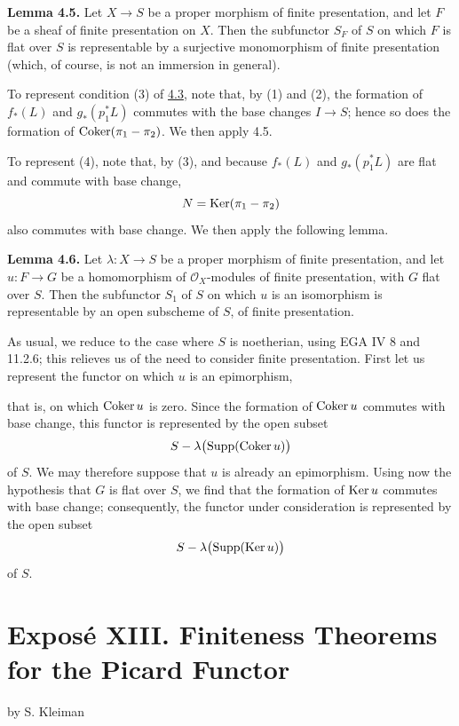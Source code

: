 \textbf{Lemma 4.5.} Let \(X\to S\) be a proper morphism of finite
presentation, and let \(F\) be a sheaf of finite presentation on \(X\). Then
the subfunctor \(S_F\) of \(S\) on which \(F\) is flat over \(S\) is
representable by a surjective monomorphism of finite presentation (which, of
course, is not an immersion in general).

To represent condition (3) of \hyperlink{sga6.e12.lem.4-3}{4.3}, note that, by (1) and (2), the formation
of \(f_*(L)\) and \(g_*(p_1^*L)\) commutes with the base changes
\(I\to S\); hence so does the formation of
\(\operatorname{Coker}(\pi_1-\pi_2)\). We then apply 4.5.

To represent (4), note that, by (3), and because \(f_*(L)\) and
\(g_*(p_1^*L)\) are flat and commute with base change,
\[
  N=\operatorname{Ker}(\pi_1-\pi_2)
\]
also commutes with base change. We then apply the following lemma.

\textbf{Lemma 4.6.} Let \(\lambda:X\to S\) be a proper morphism of finite
presentation, and let \(u:F\to G\) be a homomorphism of
\(\mathcal O_X\)-modules of finite presentation, with \(G\) flat over
\(S\). Then the subfunctor \(S_1\) of \(S\) on which \(u\) is an
isomorphism is representable by an open subscheme of \(S\), of finite
presentation.

As usual, we reduce to the case where \(S\) is noetherian, using EGA IV 8
and 11.2.6; this relieves us of the need to consider finite presentation.
First let us represent the functor on which \(u\) is an epimorphism,

\newpage
that is, on which \(\operatorname{Coker} u\) is zero. Since the formation of
\(\operatorname{Coker} u\) commutes with base change, this functor is represented by the
open subset
\[
  S-\lambda\bigl(\operatorname{Supp}(\operatorname{Coker} u)\bigr)
\]
of \(S\). We may therefore suppose that \(u\) is already an epimorphism.
Using now the hypothesis that \(G\) is flat over \(S\), we find that the
formation of \(\operatorname{Ker} u\) commutes with base change; consequently, the functor
under consideration is represented by the open subset
\[
  S-\lambda\bigl(\operatorname{Supp}(\operatorname{Ker} u)\bigr)
\]
of \(S\).

\newpage
\section*{Expos\'e XIII. Finiteness Theorems for the Picard Functor}
\begin{center}
by S. Kleiman
\end{center}

